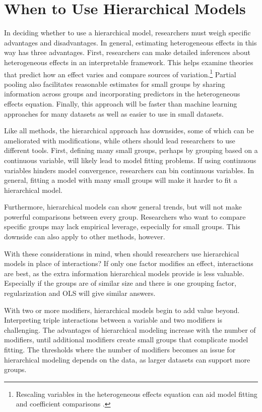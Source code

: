 \documentclass[12pt]{article}
\begin{document}
\section{When to Use Hierarchical Models}

In deciding whether to use a hierarchical model, researchers must weigh specific advantages and disadvantages. 
In general, estimating heterogeneous effects in this way has three advantages.
First, researchers can make detailed inferences about heterogeneous effects in an interpretable framework. 
This helps examine theories that predict how an effect varies and compare sources of variation.\footnote{Rescaling variables in the heterogeneous effects equation can aid model fitting and coefficient comparisons \citep{Gelman2008}.} 
Partial pooling also facilitates reasonable estimates for small groups by sharing information across groups and incorporating predictors in the heterogeneous effects equation. 
Finally, this approach will be faster than machine learning approaches for many datasets as well as easier to use in small datasets.


Like all methods, the hierarchical approach has downsides, some of which can be ameliorated with modifications, while others should lead researchers to use different tools. 
First, defining many small groups, perhaps by grouping based on a continuous variable, will likely lead to model fitting problems.
If using continuous variables hinders model convergence, researchers can bin continuous variables.
In general, fitting a model with many small groups will make it harder to fit a hierarchical model. 


Furthermore, hierarchical models can show general trends, but will not make powerful comparisons between every group. 
Researchers who want to compare specific groups may lack empirical leverage, especially for small groups.
This downside can also apply to other methods, however. 


With these considerations in mind, when should researchers use hierarchical models in place of interactions?
If only one factor modifies an effect, interactions are best, as the extra information hierarchical models provide is less valuable. 
Especially if the groups are of similar size and there is one grouping factor, regularization and OLS will give similar answers.


With two or more modifiers, hierarchical models begin to add value beyond. 
Interpreting triple interactions between a variable and two modifiers is challenging. 
The advantages of hierarchical modeling increase with the number of modifiers, until additional modifiers create small groups that complicate model fitting. 
The thresholds where the number of modifiers becomes an issue for hierarchical modeling depends on the data, as larger datasets can support more groups. 
\end{document}
